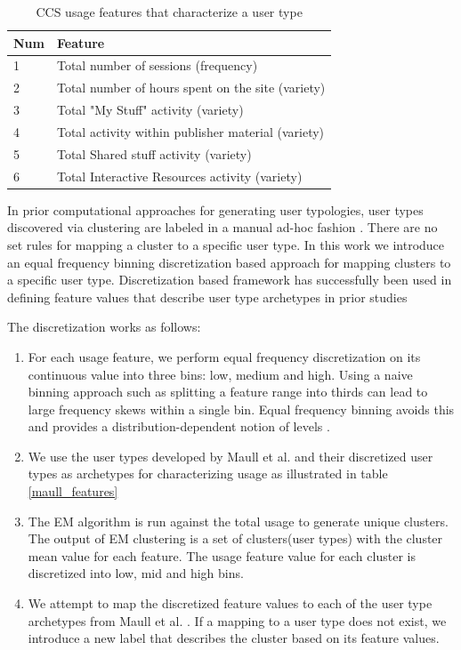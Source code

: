 \documentclass{acm_proc_article-sp}
\begin{document}
\begin{table}

\centering
\caption{CCS usage features that characterize a user type}
\label{usagefeatures}
\begin{tabular}{|l|l|} 
\hline
Num & Feature \\ \hline
1 & Total number of sessions (frequency) \\ \hline
2 & Total number of hours spent on the site (variety) \\ \hline
3 & Total "My Stuff" activity (variety) \\ \hline
4 & Total activity within publisher material (variety)\\ \hline
5 & Total Shared stuff activity (variety) \\ \hline
6 & Total Interactive Resources activity (variety)	\\ \hline
\end{tabular}
\end{table}

In prior computational approaches for generating user typologies, user types discovered via clustering are labeled in a manual ad-hoc fashion \cite{maullunderstanding, xu}. There are no set rules for mapping a cluster to a specific user type. In this work we introduce an equal frequency binning discretization based approach for mapping clusters to a specific user type. Discretization based framework has successfully been used in defining feature values that describe user type archetypes in prior studies \cite{brandtzaeg2010towards,angeletou2011modelling}

The discretization works as follows:
\begin{enumerate}

\item For each usage feature, we perform equal frequency discretization on its continuous value into three bins: low, medium and high. Using a naive binning approach such as splitting a feature range into thirds can lead to large frequency skews within a single bin. Equal frequency binning avoids this and provides a distribution-dependent notion of levels \cite{han2006data}.  

\item We use the user types developed by Maull et al. \cite{maullunderstanding} and their discretized user types as archetypes for characterizing usage as illustrated in table \ref{maull_features}

\item The EM algorithm is run against the total usage to generate unique clusters. The output of EM clustering is a set of clusters(user types) with the cluster mean value for each feature. The usage feature value for each cluster is discretized into low, mid and high bins. 

\item We attempt to map the discretized feature values to each of the user type archetypes from Maull et al. \cite{maullunderstanding}. If a mapping to a user type does not exist, we introduce a new label that describes the cluster based on its feature values.


\end{enumerate}
\end{document}
